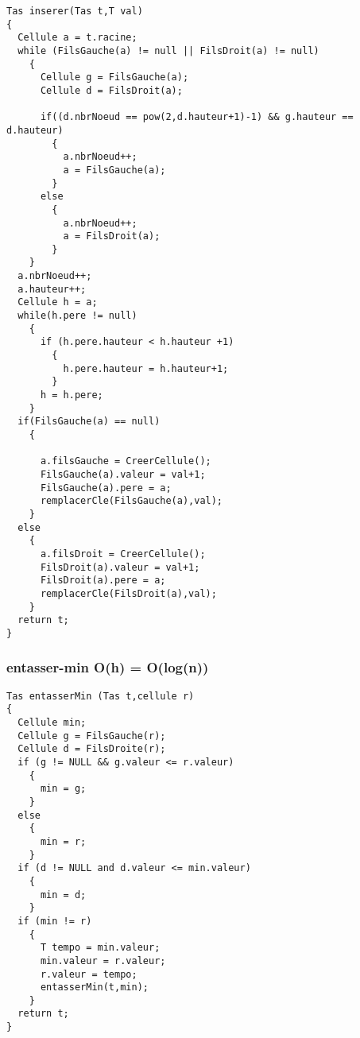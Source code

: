\documentclass[11pt]{article}
\begin{document}
\begin{lstlisting}
Tas inserer(Tas t,T val)
{
  Cellule a = t.racine;
  while (FilsGauche(a) != null || FilsDroit(a) != null)
    {
      Cellule g = FilsGauche(a);
      Cellule d = FilsDroit(a);

      if((d.nbrNoeud == pow(2,d.hauteur+1)-1) && g.hauteur == d.hauteur)
        {
          a.nbrNoeud++;
          a = FilsGauche(a);
        }
      else
        {
          a.nbrNoeud++;
          a = FilsDroit(a);
        }
    }
  a.nbrNoeud++;
  a.hauteur++;
  Cellule h = a;
  while(h.pere != null)
    {
      if (h.pere.hauteur < h.hauteur +1)
        {
          h.pere.hauteur = h.hauteur+1;
        }
      h = h.pere;
    }
  if(FilsGauche(a) == null)
    {

      a.filsGauche = CreerCellule();
      FilsGauche(a).valeur = val+1; 
      FilsGauche(a).pere = a; 
      remplacerCle(FilsGauche(a),val);
    }
  else
    {
      a.filsDroit = CreerCellule();
      FilsDroit(a).valeur = val+1; 
      FilsDroit(a).pere = a; 
      remplacerCle(FilsDroit(a),val);
    }
  return t;
}  
\end{lstlisting}

\subsubsection{entasser-min O(h) = O(log(n))}
\label{sec:org4e9427a}

\begin{lstlisting}
Tas entasserMin (Tas t,cellule r) 
{
  Cellule min;
  Cellule g = FilsGauche(r);
  Cellule d = FilsDroite(r);
  if (g != NULL && g.valeur <= r.valeur)
    {
      min = g;
    }
  else
    {
      min = r;
    }
  if (d != NULL and d.valeur <= min.valeur)
    {
      min = d;
    }
  if (min != r)
    {
      T tempo = min.valeur;
      min.valeur = r.valeur;
      r.valeur = tempo;
      entasserMin(t,min);
    }
  return t;
}
\end{lstlisting}
\end{document}
